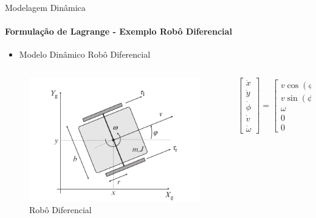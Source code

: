 \documentclass{beamer}
\begin{document}
\begin{frame}{Modelagem Dinâmica}
    \framesubtitle{Formulação de Lagrange - Exemplo Robô Diferencial}

    \begin{itemize}
        \item Modelo Dinâmico Robô Diferencial
    \end{itemize}

    \begin{columns}
        \begin{column}[c]{0.4\textwidth}
            \begin{figure}
                \centering
                \includegraphics[width=1\textwidth]{./images/dynamic_diff_car.png}
                \caption{Robô Diferencial}
            \end{figure}
        \end{column}
        \begin{column}[c]{0.6\textwidth}
            \begin{equation*}
                \begin{bmatrix}
                    \dot{x} \\ \dot{y} \\ \dot{\phi} \\ \dot{v} \\ \dot{\omega}
                \end{bmatrix}=
                \begin{bmatrix}
                    v \cos(\phi) \\ v \sin(\phi) \\ \omega \\ 0 \\ 0

\end{bmatrix}
\end{equation*}
\end{column}
\end{columns}
\end{frame}
\end{document}
